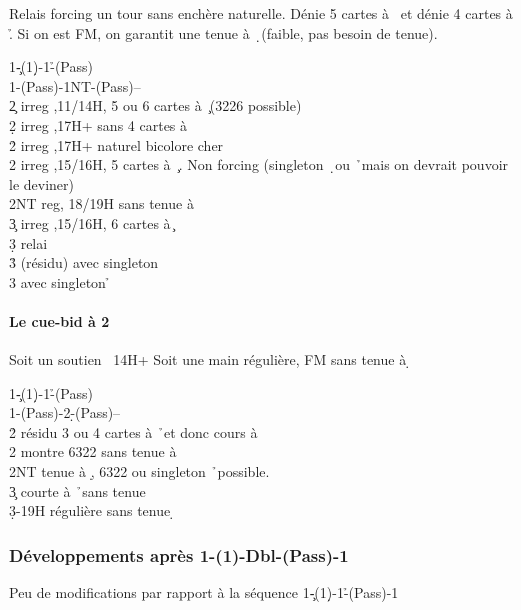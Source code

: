 \documentclass[a4paper]{article}
\begin{document}
Relais forcing un tour sans enchère naturelle. Dénie 5 cartes à \s\ et dénie 4 cartes à \h . 
Si on est FM, on garantit une tenue à \d\ (faible, pas besoin de tenue).

\begin{bidtable}
1\c-(1\d)-1\h-(Pass)\\
1\s-(Pass)-1NT-(Pass)--\\
2\c \> irreg ,11/14H, 5 ou 6 cartes à \c\ (3226 possible)\\
2\d \> irreg ,17H+ sans 4 cartes à \h \\
2\h \> irreg ,17H+ naturel bicolore cher\\
2\s \> irreg ,15/16H, 5 cartes à \c\ . Non forcing (singleton \d\ ou \h\ mais on devrait pouvoir le deviner)\\
2NT \> reg, 18/19H sans tenue à \d \\
3\c \> irreg ,15/16H, 6 cartes à \c \+\\
3\d \> relai\+\\
3\h \> (résidu) avec singleton \d \\
3\s \> avec singleton \h \-\-
\end{bidtable}

\paragraph{Le cue-bid à 2 \pdfd}

Soit un soutien \s\ 14H+
Soit une main régulière, FM sans tenue à \d 

\begin{bidtable}
1\c-(1\d)-1\h-(Pass)\\
1\s-(Pass)-2\d-(Pass)--\\
2\h \> résidu 3 ou 4 cartes à \h\ et donc cours à \d \\
2\s \> montre 6322 sans tenue à \d \\
2NT \> tenue à \d , 6322 ou singleton \h\ possible.\\
3\c \> courte à \h\ sans tenue \d \\
3\d {}-19H régulière sans tenue \d 
\end{bidtable}

\subsubsection{Développements après 1\pdfc-(1\pdfh)-Dbl-(Pass)-1\pdfs}

Peu de modifications par rapport à la séquence
1\c -(1\d )-1\h -(Pass)-1\s 
\end{document}
